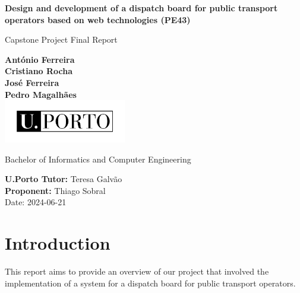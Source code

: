 \documentclass[10pt]{article}
\begin{document}
\begin{titlepage}
    \begin{center}
        \vspace*{1cm}

    {\fontsize{17}{16}\selectfont \textbf{Design and development of a dispatch board for public transport operators based on web technologies (PE43)}}

        \vspace{0.5cm}
        Capstone Project Final Report

        \vfill

        \textbf{António Ferreira} \\
        \textbf{Cristiano Rocha} \\
        \textbf{José Ferreira} \\
        \textbf{Pedro Magalhães} \\

        \vfill
        \includegraphics[width=0.4\textwidth]{UPORTO_fundotransparente}


        Bachelor of Informatics and Computer Engineering

        \vspace{0.8cm}

        \textbf{U.Porto Tutor:} Teresa Galvão \\
        \textbf{Proponent:} Thiago Sobral \\

    \vspace{0.4cm}
    Date: 2024-06-21

    \end{center}
\end{titlepage}

\thispagestyle{empty}
\clearpage

\thispagestyle{empty}
\tableofcontents

\clearpage

\section{Introduction}
    This report aims to provide an overview of our project that involved the implementation of a system for a dispatch board for public transport operators.
\end{document}
